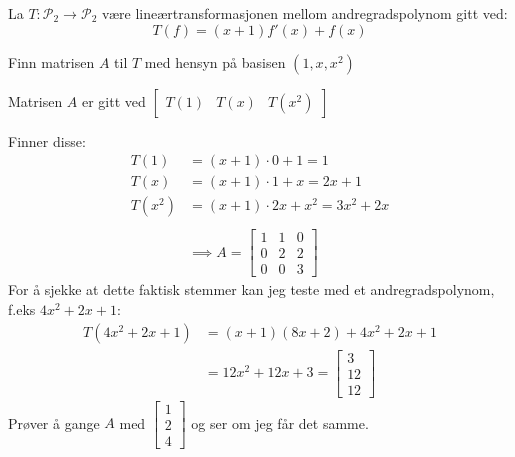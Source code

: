 \documentclass[11pt, a4paper, norsk]{NTNUoving}
\begin{document}
    \begin{oppgave}
        La $T : \mathcal{P}_{2} \rightarrow \mathcal{P}_{2}$ være lineærtransformasjonen mellom andregradspolynom gitt ved: $$T(f) = (x+1)f'(x)+f(x)$$

        \begin{punkt}
            Finn matrisen $A$ til $T$ med hensyn på basisen $(1, x, x^2)$

            Matrisen $A$ er gitt ved $\begin{bmatrix}
                T(1) & T(x) & T(x^2)
            \end{bmatrix}$

            Finner disse:
            \begin{align*}
                T(1) &= (x+1)\cdot 0 + 1 = 1 \\
                T(x) &= (x+1) \cdot 1 + x = 2x + 1 \\
                T(x^2) &= (x+1) \cdot 2x + x^2 = 3x^2 +2x
                \\
                \\
                       &\implies A = \begin{bmatrix}
                           1 & 1 & 0 \\
                           0 & 2 & 2 \\
                           0 & 0 & 3
                       \end{bmatrix}
            \end{align*}
            For å sjekke at dette faktisk stemmer kan jeg teste med et andregradspolynom, f.eks $4x^2 + 2x + 1$:
            \begin{align*}
                T(4x^2 + 2x + 1) &= (x + 1)(8x + 2) + 4x^2 + 2x + 1
                \\
                                 &= 12x^2 + 12x + 3 = \begin{bmatrix}
                                     3 \\
                                     12 \\
                                     12
                                 \end{bmatrix}
            \end{align*}
            Prøver å gange $A$ med $\begin{bmatrix}
                1 \\
                2 \\
                4
            \end{bmatrix}$ og ser om jeg får det samme.

\end{punkt}
\end{oppgave}
\end{document}
